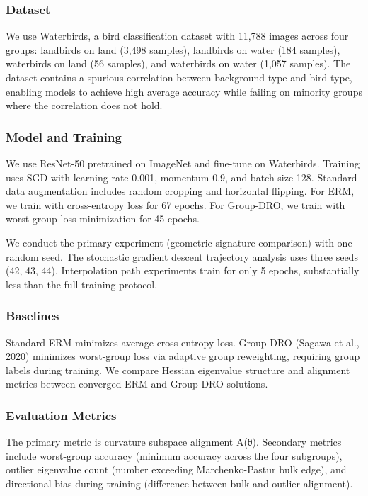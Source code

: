 
\subsubsection{Dataset}

We use Waterbirds, a bird classification dataset with 11,788 images across four groups: landbirds on land (3,498 samples), landbirds on water (184 samples), waterbirds on land (56 samples), and waterbirds on water (1,057 samples). The dataset contains a spurious correlation between background type and bird type, enabling models to achieve high average accuracy while failing on minority groups where the correlation does not hold.

\subsubsection{Model and Training}

We use ResNet-50 pretrained on ImageNet and fine-tune on Waterbirds. Training uses SGD with learning rate 0.001, momentum 0.9, and batch size 128. Standard data augmentation includes random cropping and horizontal flipping. For ERM, we train with cross-entropy loss for 67 epochs. For Group-DRO, we train with worst-group loss minimization for 45 epochs.

We conduct the primary experiment (geometric signature comparison) with one random seed. The stochastic gradient descent trajectory analysis uses three seeds (42, 43, 44). Interpolation path experiments train for only 5 epochs, substantially less than the full training protocol.

\subsubsection{Baselines}

Standard ERM minimizes average cross-entropy loss. Group-DRO (Sagawa et al., 2020) minimizes worst-group loss via adaptive group reweighting, requiring group labels during training. We compare Hessian eigenvalue structure and alignment metrics between converged ERM and Group-DRO solutions.

\subsubsection{Evaluation Metrics}

The primary metric is curvature subspace alignment A(θ). Secondary metrics include worst-group accuracy (minimum accuracy across the four subgroups), outlier eigenvalue count (number exceeding Marchenko-Pastur bulk edge), and directional bias during training (difference between bulk and outlier alignment).
